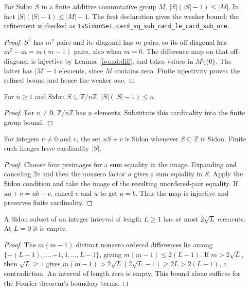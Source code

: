 \begin{theorem}
\leanok\label{found:finite}
For Sidon $S$ in a finite additive commutative group $M$,
$|S|(|S|-1)\leq|M|$. In fact $|S|(|S|-1)\leq|M|-1$.
The first declaration gives the weaker bound; the refinement is checked as
\texttt{IsSidonSet.card\_sq\_sub\_card\_le\_card\_sub\_one}.
\end{theorem}
\begin{proof}
$S^2$ has $m^2$ pairs and its diagonal has $m$ pairs, so its
off-diagonal has $m^2-m=m(m-1)$ pairs, also when $m=0$.
The difference map on that off-diagonal is injective by
Lemma~\ref{found:diff}, and takes values in $M\setminus\{0\}$.
The latter has $|M|-1$ elements, since $M$ contains zero.
Finite injectivity proves the refined bound and hence the weaker one.
\end{proof}

\begin{corollary}
\leanok{}
For $n\geq1$ and Sidon $S\subseteq\mathbb Z/n\mathbb Z$,
$|S|(|S|-1)\leq n$.
\end{corollary}
\begin{proof}
For $n\ne0$, $\mathbb Z/n\mathbb Z$ has $n$ elements.
Substitute this cardinality into the finite group bound.
\end{proof}

\begin{lemma}
\leanok
\label{found:affine}
For integers $u\ne0$ and $v$, the set $uS+v$ is Sidon whenever
$S\subseteq\mathbb Z$ is Sidon. Finite such images have cardinality $|S|$.
\end{lemma}
\begin{proof}
Choose four preimages for a sum equality in the image. Expanding and
canceling $2v$ and then the nonzero factor $u$ gives a sum equality in
$S$. Apply the Sidon condition and take the image of the resulting
unordered-pair equality. If $ua+v=ub+v$, cancel $v$ and $u$ to get
$a=b$. Thus the map is injective and preserves finite cardinality.
\end{proof}

\begin{lemma}\label{found:crude}
\leanok
A Sidon subset of an integer interval of length $L\geq1$ has
at most $2\sqrt L$ elements. At $L=0$ it is empty.
\end{lemma}
\begin{proof}
The $m(m-1)$ distinct nonzero ordered differences lie among
$\{-(L-1),\ldots,-1,1,\ldots,L-1\}$, giving
$m(m-1)\leq2(L-1)$.
If $m>2\sqrt L$, then $\sqrt L\geq1$ gives
$m(m-1)>2\sqrt L(2\sqrt L-1)\geq2L>2(L-1)$,
a contradiction. An interval of length zero is empty.
This bound alone suffices for the Fourier theorem's boundary terms.
\end{proof}

